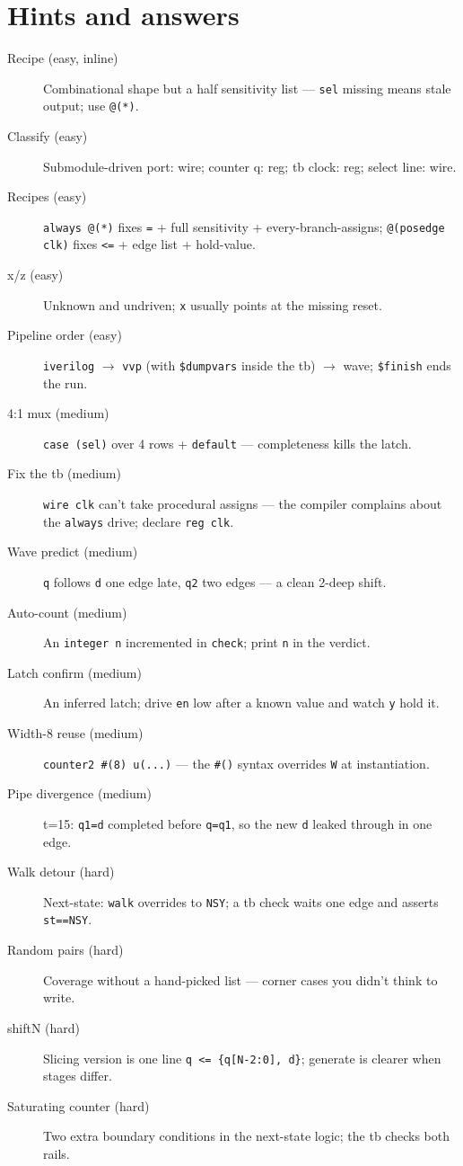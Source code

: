 \section*{Hints and answers}
\begin{description}
\item[Recipe (easy, inline)] Combinational shape but a half sensitivity
list --- \texttt{sel} missing means stale output; use \texttt{@(*)}.
\item[Classify (easy)] Submodule-driven port: wire; counter q: reg;
tb clock: reg; select line: wire.
\item[Recipes (easy)] \texttt{always @(*)} fixes \texttt{=} + full
sensitivity + every-branch-assigns; \texttt{@(posedge clk)} fixes
\texttt{<=} + edge list + hold-value.
\item[x/z (easy)] Unknown and undriven; \texttt{x} usually points at
the missing reset.
\item[Pipeline order (easy)] \texttt{iverilog} $\to$ \texttt{vvp}
(with \texttt{\$dumpvars} inside the tb) $\to$ wave; \texttt{\$finish}
ends the run.
\item[4:1 mux (medium)] \texttt{case (sel)} over 4 rows +
\texttt{default} --- completeness kills the latch.
\item[Fix the tb (medium)] \texttt{wire clk} can't take procedural
assigns --- the compiler complains about the \texttt{always} drive;
declare \texttt{reg clk}.
\item[Wave predict (medium)] \texttt{q} follows \texttt{d} one edge
late, \texttt{q2} two edges --- a clean 2-deep shift.
\item[Auto-count (medium)] An \texttt{integer n} incremented in
\texttt{check}; print \texttt{n} in the verdict.
\item[Latch confirm (medium)] An inferred latch; drive \texttt{en} low
after a known value and watch \texttt{y} hold it.
\item[Width-8 reuse (medium)] \texttt{counter2 \#(8) u(...)} --- the
\texttt{\#()} syntax overrides \texttt{W} at instantiation.
\item[Pipe divergence (medium)] t=15: \texttt{q1=d} completed before
\texttt{q=q1}, so the new \texttt{d} leaked through in one edge.
\item[Walk detour (hard)] Next-state: \texttt{walk} overrides to
\texttt{NSY}; a tb check waits one edge and asserts
\texttt{st==NSY}.
\item[Random pairs (hard)] Coverage without a hand-picked list ---
corner cases you didn't think to write.
\item[shiftN (hard)] Slicing version is one line
\texttt{q <= \{q[N-2:0], d\}}; generate is clearer when stages differ.
\item[Saturating counter (hard)] Two extra boundary conditions in the
next-state logic; the tb checks both rails.
\end{description}

